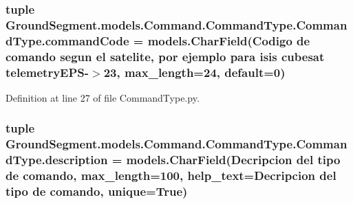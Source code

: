 \hypertarget{class_ground_segment_1_1models_1_1_command_1_1_command_type_1_1_command_type_a3d55c90fa0f903e94e2d0a5942ee1b8d}{}
\subsubsection[{command\+Code}]{\setlength{\rightskip}{0pt plus 5cm}tuple Ground\+Segment.\+models.\+Command.\+Command\+Type.\+Command\+Type.\+command\+Code = models.\+Char\+Field(\textquotesingle{}Codigo de comando segun el satelite, por ejemplo para isis cubesat telemetry\+E\+P\+S-\/$>$23\textquotesingle{}, max\+\_\+length=24, default=\textquotesingle{}0\textquotesingle{})\hspace{0.3cm}{\ttfamily [static]}}\label{class_ground_segment_1_1models_1_1_command_1_1_command_type_1_1_command_type_a3d55c90fa0f903e94e2d0a5942ee1b8d}


Definition at line 27 of file Command\+Type.\+py.

\hypertarget{class_ground_segment_1_1models_1_1_command_1_1_command_type_1_1_command_type_a9b66765ef6a339ecb2b35a2761de3cd8}{}
\subsubsection[{description}]{\setlength{\rightskip}{0pt plus 5cm}tuple Ground\+Segment.\+models.\+Command.\+Command\+Type.\+Command\+Type.\+description = models.\+Char\+Field(\textquotesingle{}Decripcion del tipo de comando\textquotesingle{}, max\+\_\+length=100, help\+\_\+text=\textquotesingle{}Decripcion del tipo de comando\textquotesingle{}, unique=True)\hspace{0.3cm}{\ttfamily [static]}}\label{class_ground_segment_1_1models_1_1_command_1_1_command_type_1_1_command_type_a9b66765ef6a339ecb2b35a2761de3cd8}


